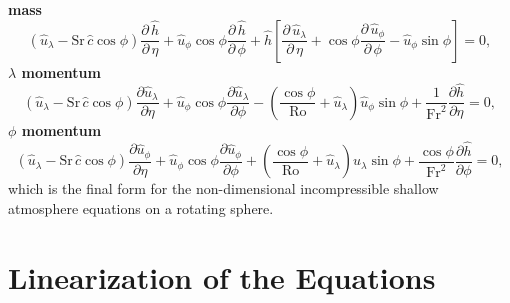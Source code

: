 {\bfseries mass}
\begin{equation}
\left(\hat{u}_{\scriptscriptstyle \lambda}-\mathrm{Sr}\,\hat{c}\cos\phi\right)\frac{\partial \, \hat{h}}{\partial \, \eta} + \hat{u}_{\scriptscriptstyle \phi}\cos\phi\frac{\partial \, \hat{h}}{\partial \, \phi}+\hat{h}\left[\frac{\partial \, \hat{u}_{\scriptscriptstyle \lambda}}{\partial \, \eta}+\cos\phi\frac{\partial \, \hat{u}_{\scriptscriptstyle \phi}}{\partial \, \phi}-\hat{u}_{\scriptscriptstyle \phi}\sin\phi\right]=0, \label{eq:massincom2non}
\end{equation}
{\bfseries \boldmath$\lambda$ momentum}
\begin{equation}
\left(\hat{u}_{\scriptscriptstyle \lambda}-\mathrm{Sr}\,\hat{c}\cos\phi\right)\frac{\partial \hat{u}_{\scriptscriptstyle \lambda}}{\partial \eta} + \hat{u}_{\scriptscriptstyle \phi}\cos\phi\frac{\partial \hat{u}_{\scriptscriptstyle \lambda}}{\partial \phi} - \left(\frac{\cos\phi}{\mathrm{Ro}} + \hat{u}_{\scriptscriptstyle \lambda}\right)\hat{u}_{\scriptscriptstyle \phi}\sin\phi + \frac{1}{\mathrm{Fr}^2}\frac{\partial \hat{h}}{\partial \eta} = 0, \label{eq:lamincom2non}
\end{equation}
{\bfseries \boldmath$\phi$ momentum}
\begin{equation}
\left(\hat{u}_{\scriptscriptstyle \lambda}-\mathrm{Sr}\,\hat{c}\cos\phi\right)\frac{\partial \hat{u}_{\scriptscriptstyle \phi}}{\partial \eta} + \hat{u}_{\scriptscriptstyle \phi}\cos\phi\frac{\partial \hat{u}_{\scriptscriptstyle \phi}}{\partial \phi} + \left(\frac{\cos\phi}{\mathrm{Ro}} + \hat{u}_{\scriptscriptstyle \lambda} \right)\hat{u}_{\scriptscriptstyle \lambda}\sin\phi + \frac{\cos\phi}{\mathrm{Fr}^2}\frac{\partial \hat{h}}{\partial \phi} = 0, \label{eq:phiincom2non}
\end{equation}
which is the final form for the non-dimensional incompressible shallow atmosphere equations on a rotating sphere.
\section{Linearization of the Equations}
